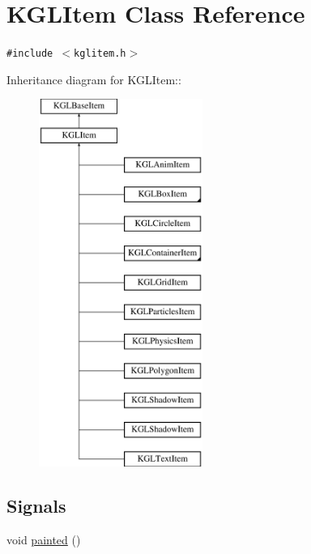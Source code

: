 \hypertarget{class_k_g_l_item}{
\section{KGLItem Class Reference}
\label{class_k_g_l_item}
}
{\tt \#include $<$kglitem.h$>$}

Inheritance diagram for KGLItem::\begin{figure}[H]
\begin{center}
\leavevmode
\includegraphics[height=12cm]{class_k_g_l_item}
\end{center}
\end{figure}
\subsection*{Signals}
\begin{CompactItemize}
\item 
void \hyperlink{class_k_g_l_item_9a6bf78a4509a1e38fc7be170ea0003e}{painted} ()
\end{CompactItemize}
